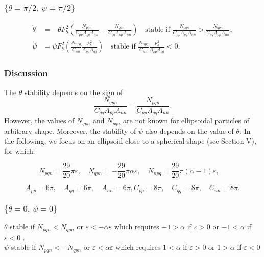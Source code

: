 \documentclass[12pt]{My_preprint}
\begin{document}
\subsubsection{$\{\theta = \pi/2, \, \psi = \pi/2\}$}
\begin{align}
    \dot \theta  &=  -\theta F_b^2 \left(\frac{N_{pqn}}{C_{pp}A_{qq} A_{nn}} - \frac{N_{qpn}}{C_{qq}A_{pp} A_{nn}}\right)\quad \text{stable if $\frac{N_{pqn}}{C_{pp}A_{qq} A_{nn}}$} >\frac{N_{qpn}}{C_{qq}A_{pp} A_{nn}}, \\
    \dot \psi   &= \psi F_b^2 \left(\frac{N_{npq}}{C_{nn}}\frac{F_b^2}{A_{pp} A_{qq}}\right)\quad \text{stable if $\frac{N_{npq}}{C_{nn}}\frac{F_b^2}{A_{pp} A_{qq}}<0$}.
\end{align}

\subsubsection{Discussion}

The $\theta$ stability depends on the sign of
\begin{equation}
\frac{N_{qpn}}{C_{qq} A_{pp} A_{nn}} - \frac{N_{pqn}}{C_{pp} A_{qq} A_{nn}} .
\end{equation}
However, the values of $N_{qpn}$ and $N_{pqn}$ are not known for ellipsoidal particles of arbitrary shape.
Moreover, the stability of $\psi$ also depends on the value of $\theta$.
In the following, we focus on an ellipsoid close to a spherical shape (see Section V), for which:

$$
N_{pqn} = \frac{29}{20}\pi \varepsilon, \quad
N_{qpn} = -\frac{29}{20}\pi \alpha \varepsilon, \quad
N_{npq} = \frac{29}{20}\pi (\alpha - 1)\varepsilon, \quad $$

$$
A_{pp} = 6\pi, \quad A_{qq} = 6\pi,  \quad A_{nn} = 6\pi ,
C_{pp} = 8\pi, \quad C_{qq} = 8\pi,  \quad C_{nn} = 8\pi .
$$

\subsubsection{$\{\theta = 0, \, \psi = 0\}$}

$\theta$ stable if $N_{pqn} < N_{qpn}$ or $\varepsilon < -\alpha \varepsilon$ which requires  $-1>\alpha$ if  $\varepsilon > 0$ or $-1 < \alpha$ if $\varepsilon < 0$ .\\
$\psi$ stable if $N_{pqn} < -N_{qpn}$ or $\varepsilon < \alpha \varepsilon$ which requires  $1<\alpha$ if  $\varepsilon > 0$ or $1 > \alpha$ if $\varepsilon < 0$
\end{document}
